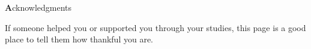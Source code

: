 \clearemptydoublepage
{}
{}

\vspace*{2cm}

\begin{center}
{\Large \textbf Acknowledgments}
\end{center}

\vspace{1cm}



\begin{center}
If someone helped you or supported you through your studies, this page is a
good place to tell them how thankful you are.
\end{center}
